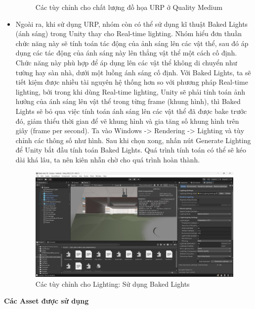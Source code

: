 \begin{itemize}
\begin{figure}[H]
        \caption{Các tùy chỉnh cho chất lượng đồ họa URP ở Quality Medium}
        \label{fig:unityrp_3}
    \end{figure}
    \item Ngoài ra, khi sử dụng URP, nhóm còn có thể sử dụng kĩ thuật Baked Lights (ánh sáng) trong Unity thay cho Real-time lighting. Nhóm hiểu đơn thuần chức năng này sẽ tính toán tác động của ảnh sáng lên các vật thể, sau đó áp dụng các tác động của ánh sáng này lên thẳng vật thể một cách cố định. Chức năng này phù hợp để áp dụng lên các vật thể không di chuyển như tường hay sàn nhà, dưới một luồng ánh sáng cố định. Với Baked Lights, ta sẽ tiết kiệm được nhiều tài nguyên hệ thống hơn so với phương pháp Real-time lighting, bởi trong khi dùng Real-time lighting, Unity sẽ phải tính toán ảnh hưởng của ánh sáng lên vật thể trong từng frame (khung hình), thì Baked Lights sẽ bỏ qua việc tính toán ánh sáng lên các vật thể đã được bake trước đó, giảm thiểu thời gian để vẽ khung hình và gia tăng số khung hình trên giây (frame per second). Ta vào Windows -> Rendering -> Lighting và tùy chỉnh các thông số như hình. Sau khi chọn xong, nhấn nút Generate Lighting để Unity bắt đầu tính toán Baked Lights. Quá trình tính toán có thể sẽ kéo dài khá lâu, ta nên kiên nhẫn chờ cho quá trình hoàn thành.
    \begin{figure}[H]
        \centering
        \includegraphics[width=1\textwidth]{Images/Implementation/VRapp/unityrp_4}
        \caption{Các tùy chỉnh cho Lighting: Sử dụng Baked Lights}
        \label{fig:unityrp_4}
    \end{figure}

    
\end{itemize}

\textbf{Các Asset được sử dụng} 


